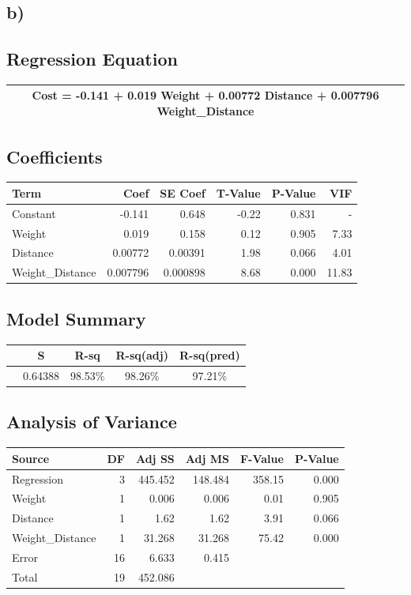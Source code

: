 \documentclass{article}
\begin{document}
\subsection*{b)}
\subsection*{Regression Equation}
\begin{tabular}{c}
\toprule
Cost = -0.141 + 0.019 Weight + 0.00772 Distance + 0.007796 Weight\_Distance \\
\bottomrule
\end{tabular}

\subsection*{Coefficients}
\begin{tabular}{lrrrrr}
\toprule
Term & Coef & SE Coef & T-Value & P-Value & VIF \\
\midrule
Constant & -0.141 & 0.648 & -0.22 & 0.831 & - \\
Weight & 0.019 & 0.158 & 0.12 & 0.905 & 7.33 \\
Distance & 0.00772 & 0.00391 & 1.98 & 0.066 & 4.01 \\
Weight\_Distance & 0.007796 & 0.000898 & 8.68 & 0.000 & 11.83 \\
\bottomrule
\end{tabular}

\subsection*{Model Summary}
\begin{tabular}{lcccc}
\toprule
 & S & R-sq & R-sq(adj) & R-sq(pred) \\
\midrule
 & 0.64388 & 98.53\% & 98.26\% & 97.21\% \\
\bottomrule
\end{tabular}

\subsection*{Analysis of Variance}
\begin{tabular}{lrrrrr}
\toprule
Source & DF & Adj SS & Adj MS & F-Value & P-Value \\
\midrule
Regression & 3 & 445.452 & 148.484 & 358.15 & 0.000 \\
Weight & 1 & 0.006 & 0.006 & 0.01 & 0.905 \\
Distance & 1 & 1.62 & 1.62 & 3.91 & 0.066 \\
Weight\_Distance & 1 & 31.268 & 31.268 & 75.42 & 0.000 \\
Error & 16 & 6.633 & 0.415 & & \\
Total & 19 & 452.086 & & & \\
\bottomrule
\end{tabular}
\end{document}
